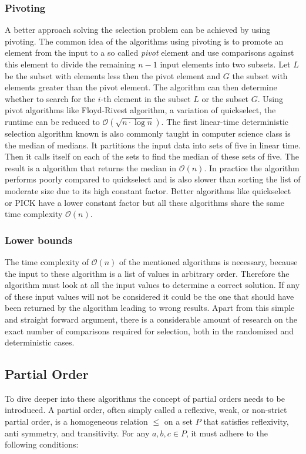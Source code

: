 \documentclass[10pt,journal,compsoc]{IEEEtran}
\begin{document}
\subsubsection{Pivoting}
A better approach solving the selection problem can be achieved by using pivoting. The common idea
of the algorithms using pivoting is to promote an element from the input to a so called
\textit{pivot} element and use comparisons against this element to divide the remaining $n-1$ input
elements into two subsets. Let $L$ be the subset with elements less then the pivot element and $G$
the subset with elements greater than the pivot element. The algorithm can then determine whether to
search for the $i$-th element in the subset $L$ or the subset $G$. Using pivot algorithms like
Floyd-Rivest algorithm, a variation of quickselect, the runtime can be reduced to
$\mathcal{O}(\sqrt{n \cdot \log n})$. The first linear-time deterministic selection algorithm known
is  also commonly taught in computer science class is the median of medians. It partitions the input
data into sets of five in linear time. Then it calls itself on each of the sets to find the median
of these sets of five. The result is a algorithm that returns the median in $\mathcal{O}(n)$. In
practice the algorithm performs poorly compared to quickselect and is also slower than sorting the
list of moderate size due to its high constant factor. Better algorithms like quickselect or PICK
have a lower constant factor but all these algorithms share the same time complexity $\mathcal{O}(n)$.

\subsubsection{Lower bounds}
The time complexity of $\mathcal{O}(n)$ of the mentioned algorithms is necessary, because the input
to these algorithm is a list of values in arbitrary order. Therefore the algorithm must look at all
the input values to determine a correct solution. If any of these input values will not be
considered it could be the one that should have been returned by the algorithm leading to wrong
results. Apart from this simple and straight forward argument, there is a considerable amount of
research on the exact number of comparisons required for selection, both in the randomized and
deterministic cases.

\subsection{Partial Order}
To dive deeper into these algorithms the concept of partial orders needs to be introduced. A partial
order, often simply called a reflexive, weak, or non-strict partial order, is a homogeneous relation
$\leq$ on a set $P$ that satisfies reflexivity, anti symmetry, and transitivity. For any $a, b, c
  \in P$, it must adhere to the following conditions:
\end{document}
